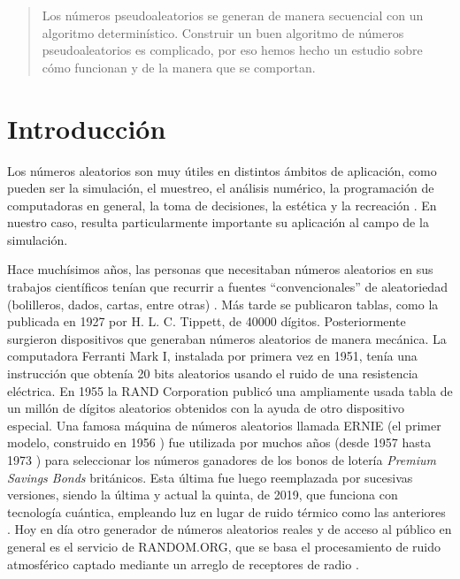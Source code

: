 \begin{abstract}
Los números pseudoaleatorios se generan de manera secuencial con un algoritmo determinístico. Construir un buen algoritmo de números pseudoaleatorios es complicado, por eso hemos hecho un estudio sobre cómo funcionan y de la manera que se comportan.
\end{abstract}




\section{Introducción}
Los números aleatorios son muy útiles en distintos ámbitos de aplicación, como pueden ser la simulación, el muestreo, el análisis numérico, la programación de computadoras en general, la toma de decisiones, la estética y la recreación \cite{knuth1997seminumerical}. En nuestro caso, resulta particularmente importante su aplicación al campo de la simulación.

Hace muchísimos años, las personas que necesitaban números aleatorios en sus trabajos científicos tenían que recurrir a fuentes ``convencionales'' de aleatoriedad (bolilleros, dados, cartas, entre otras) \cite{knuth1997seminumerical}. Más tarde se publicaron tablas, como la publicada en 1927 por H. L. C. Tippett, de 40000 dígitos. Posteriormente surgieron dispositivos que generaban números aleatorios de manera mecánica. La computadora Ferranti Mark I, instalada por primera vez en 1951, tenía una instrucción que obtenía 20 bits aleatorios usando el ruido de una resistencia eléctrica. En 1955 la RAND Corporation publicó una ampliamente usada tabla de un millón de dígitos aleatorios obtenidos con la ayuda de otro dispositivo especial. Una famosa máquina de números aleatorios llamada ERNIE (el primer modelo, construido en 1956 \cite{virtualernie}) fue utilizada por muchos años (desde 1957 hasta 1973 \cite{virtualernie}) para seleccionar los números ganadores de los bonos de lotería \emph{Premium Savings Bonds} británicos. Esta última fue luego reemplazada por sucesivas versiones, siendo la última y actual la quinta, de 2019, que funciona con tecnología cuántica, empleando luz en lugar de ruido térmico como las anteriores \cite{virtualernie}. Hoy en día otro generador de números aleatorios reales y de acceso al público en general es el servicio de RANDOM.ORG, que se basa el procesamiento de ruido atmosférico captado mediante un arreglo de receptores de radio \cite{randomorgfaq}.


